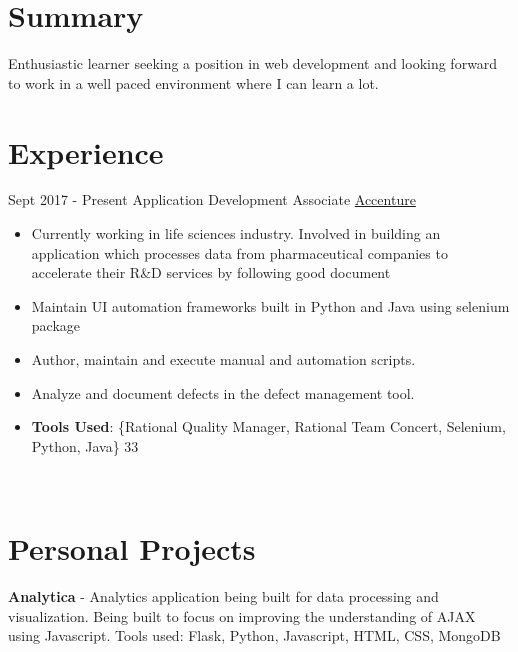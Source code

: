 \documentclass[letterpaper]{twentysecondcv} %
\begin{document}
\makeprofile %

\section{Summary}
Enthusiastic learner seeking a position in web development and looking forward to work in a well paced environment where I can learn a lot.

\section{Experience}

\begin{twenty} %
\twentyitem
    	{Sept 2017 -}
		{Present}
        {Application Development Associate}
        {\href{https://www.accenture.com/in-en}{Accenture}}
        {}
        {\begin{itemize}
        \item Currently working in life sciences industry. Involved in building an application which processes data from pharmaceutical companies to accelerate their R\&D services by following good document
        \item Maintain UI automation frameworks built in Python and Java using selenium package
        \item Author, maintain and execute manual and automation scripts.
        \item Analyze and document defects in the defect management tool.
        \item \textbf{Tools Used}: \{Rational Quality Manager, Rational Team Concert, Selenium, Python, Java\}
33        \end{itemize}}
        \\
        
\end{twenty}


\section{Personal Projects}
\textbf{Analytica} - Analytics application being built for data processing and visualization. Being built to focus on improving the understanding of AJAX using Javascript. Tools used: Flask, Python, Javascript, HTML, CSS, MongoDB\\
\end{document}
